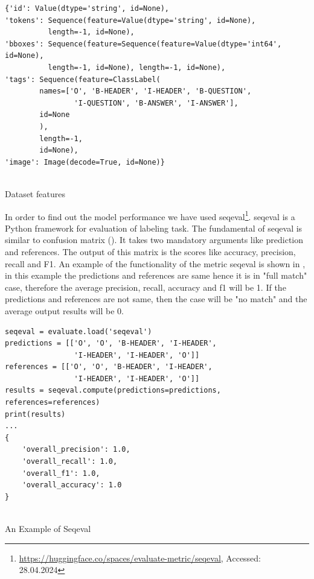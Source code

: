 \begin{listing}[!ht]

\begin{verbatim}
{'id': Value(dtype='string', id=None),
'tokens': Sequence(feature=Value(dtype='string', id=None), 
          length=-1, id=None), 
'bboxes': Sequence(feature=Sequence(feature=Value(dtype='int64', id=None), 
          length=-1, id=None), length=-1, id=None),
'tags': Sequence(feature=ClassLabel(
        names=['O', 'B-HEADER', 'I-HEADER', 'B-QUESTION', 
                'I-QUESTION', 'B-ANSWER', 'I-ANSWER'], 
        id=None
        ), 
        length=-1, 
        id=None),
'image': Image(decode=True, id=None)}    
    
\end{verbatim}

\caption{Dataset features}
\label{Listing:dataset_deatures}   
\end{listing}

In order to find out the model performance we have used seqeval\footnote{\url{https://huggingface.co/spaces/evaluate-metric/seqeval}, Accessed: 28.04.2024}. seqeval is a Python framework for evaluation of labeling task. The fundamental of seqeval is similar to confusion matrix (). It takes two mandatory arguments like prediction and references. The output of this matrix is the scores like accuracy, precision, recall and F1. An example of the functionality of the metric seqeval is shown in , in this example the predictions and references are same hence it is in "full match" case, therefore the average precision, recall, accuracy and f1 will be 1. If the predictions and references are not same, then the case will be "no match" and the average output results will be 0. 

\begin{listing}[!ht]

\begin{verbatim}
seqeval = evaluate.load('seqeval')
predictions = [['O', 'O', 'B-HEADER', 'I-HEADER',
                'I-HEADER', 'I-HEADER', 'O']]
references = [['O', 'O', 'B-HEADER', 'I-HEADER', 
                'I-HEADER', 'I-HEADER', 'O']]
results = seqeval.compute(predictions=predictions, references=references)
print(results)
...
{
    'overall_precision': 1.0, 
    'overall_recall': 1.0, 
    'overall_f1': 1.0, 
    'overall_accuracy': 1.0
} 
    
\end{verbatim}

\caption{An Example of Seqeval}
\label{Listing:seqeval_example}   
\end{listing}